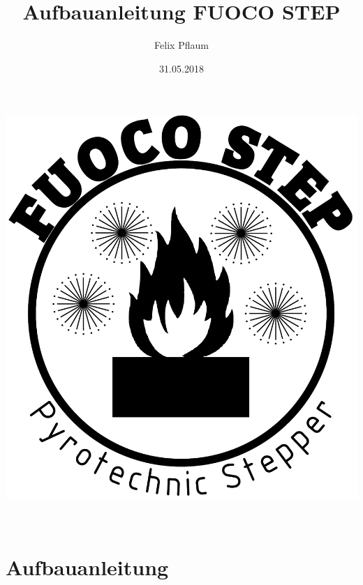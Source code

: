 \documentclass[paper=a4, open=any]{scrbook}
\title{Aufbauanleitung FUOCO STEP}
\author{Felix Pflaum}
\date{31.05.2018}
\begin{document}
\begin{titlepage}
	\vspace*{\fill}
	\begin{center}
		\includegraphics[width=\textwidth]{logo}
	\end{center}
	\vfill
	\begin{center}{\fontsize{40pt}{40pt} } \\ \vfill
		{\fontsize{24pt}{24pt} }
	\end{center}
	\vfill
\end{titlepage}
\part{Aufbauanleitung}
\end{document}
